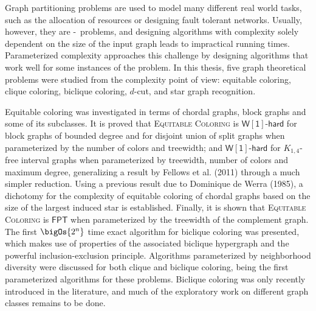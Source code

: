 Graph partitioning problems are used to model many different real world tasks, such as the allocation of resources or designing fault tolerant networks.
Usually, however, they are \NP-\Hard\ problems, and designing algorithms with complexity solely dependent on the size of the input graph leads to impractical running times.
Parameterized complexity approaches this challenge by designing algorithms that work well for some instances of the problem.
In this thesis, five graph theoretical problems were studied from the complexity point of view: equitable coloring, clique coloring, biclique coloring, $d$-cut, and star graph recognition.

Equitable coloring was investigated in terms of chordal graphs, block graphs and some of its subclasses.
It is proved that \textsc{Equitable Coloring} is  
$\mathsf{W[1]\text{-}hard}$ for block graphs of bounded degree and for disjoint union of split graphs when parameterized by the number of colors and treewidth; and %
$\mathsf{W[1]\text{-}hard}$ for $K_{1,4}$-free interval graphs when parameterized by treewidth, number of colors and maximum degree, generalizing a result by Fellows et al. (2011) through a much simpler reduction.
Using a previous result due to Dominique de Werra (1985), a dichotomy for the complexity of equitable coloring of chordal graphs based on the size of the largest induced star is established.
Finally, it is shown that 
\textsc{Equitable Coloring} is $\mathsf{FPT}$ when parameterized by the treewidth of the complement graph.
The first $\bigOs{2^n}$ time exact algorithm for biclique coloring was presented, which makes use of properties of the associated biclique hypergraph and the powerful inclusion-exclusion principle.
Algorithms parameterized by neighborhood diversity were discussed for both clique and biclique coloring, being the first parameterized algorithms for these problems.
Biclique coloring was only recently introduced in the literature, and much of the exploratory work on different graph classes remains to be done.

